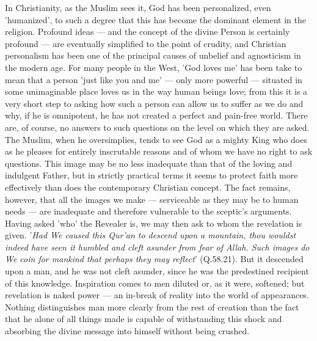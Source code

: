 \documentclass[11pt, b5paper, twoside]{book}
\begin{document}
In Christianity, as the Muslim sees it, God has been personalized, even 'humanized', to such a degree 
that this has become the dominant element in the religion. Profound ideas --- and the concept of the 
divine Person is certainly profound --- are eventually simplified to the point of crudity, and 
Christian personalism has been one of the principal causes of unbelief and agnosticism in the modern 
age. For many people in the West, 'God loves me' has been take to mean that a person 'just like you 
and me' --- only more powerful --- situated in some unimaginable place loves us in the way human beings 
love; from this it is a very short step to asking how such a person can allow us to suffer as we do 
and why, if he is omnipotent, he has not created a perfect and pain-free world. There are, of course, 
no answers to such questions on the level on which they are asked. \\

The Muslim, when he oversimplies, tends to see God as a mighty King who does as he pleases for 
entirely inscrutable reasons and of whom we have no right to ask questions. This image may be no less 
inadequate than that of the loving and indulgent Father, but in strictly practical terms it seems to 
protect faith more effectively than does the contemporary Christian concept. The fact remains, 
however, that all the images we make --- serviceable as they may be to human needs --- are inadequate and therefore vulnerable to the sceptic's arguments. \\

Having asked 'who' the Revealer is, we may then ask to whom the revelation is given. '\emph{Had We caused this Qur'an to descend upon a mountain, thou wouldst indeed have seen it humbled and cleft asunder from fear of Allah. Such images do We coin for mankind that perhaps they may reflect}' (Q.58.21). But it descended upon a man, and he was not cleft asunder, since he was the predestined recipient of this knowledge. Inspiration comes to men diluted or, as it were, softened; but revelation is naked power --- an in-break of reality into the world of appearances. Nothing distinguishes man more clearly from the rest of creation than the fact that he alone of all things made is capable of withstanding this shock and absorbing the divine message into himself without being crushed. \\
\end{document}
